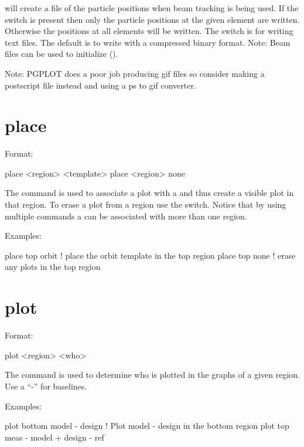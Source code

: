 {{{ will create a file of the particle positions when
beam tracking is being used. If the switch  is present then
only the particle positions at the given element are written. 
Otherwise the positions at all elements will be written. The
 switch is for writing text files. The default is to write
with a compressed binary format.  Note: Beam files can be used to
initialize \tao (). 

Note: PGPLOT does a poor job producing gif files so consider
making a postscript file instead and using a ps to gif converter.

\section{place}
\label{s:place}

Format:
\begin{example}
  place <region> <template>
  place <region> none
\end{example}

\vskip 0.2in 
The  command is used to associate a  plot
with a  and thus create a visible plot in that region. To
erase a plot from a region use the  switch. Notice that by
using multiple  commands a  can be associated
with more than one region.

Examples:
\begin{example}
  place top orbit  ! place the orbit template in the top region
  place top none   ! erase any plots in the top region
\end{example}

\section{plot}
\label{s:plot}

Format:
\begin{example}
  plot <region> <who>
\end{example}

\vskip 0.2in 
The  command is used to determine who is plotted
in the graphs of a given region. Use a ``-'' for baselines. 

Examples:
\begin{example}
  plot bottom model - design       ! Plot model - design in the bottom region
  plot top meas - model + design - ref 
\end{example}

}}}
